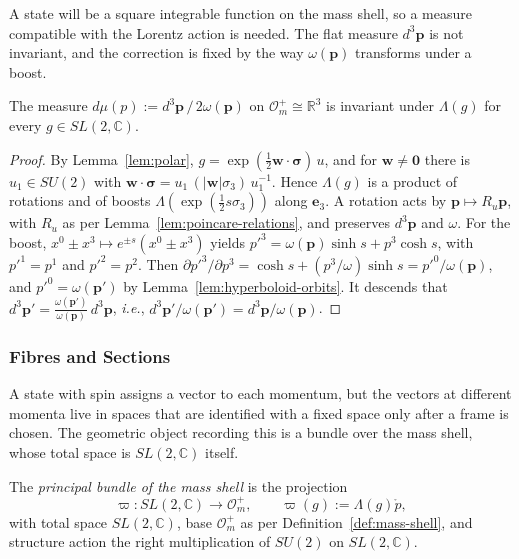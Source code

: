 A state will be a square integrable function on the mass shell, so a measure compatible with the Lorentz action is needed. The flat measure $d^3\mathbf{p}$ is not invariant, and the correction is fixed by the way $\omega(\mathbf{p})$ transforms under a boost.

\begin{lemma}\label{lem:invariant-measure}
	The measure $d\mu(p):=d^3\mathbf{p}\,/\,2\omega(\mathbf{p})$ on $\mathcal{O}_m^+\cong\mathbb{R}^3$ is invariant under $\Lambda(g)$ for every $g\in SL(2,\mathbb{C})$.
\end{lemma}

\begin{proof}
	By Lemma~\ref{lem:polar}, $g=\exp(\tfrac12\mathbf{w}\cdot\boldsymbol{\sigma})\,u$, and for $\mathbf{w}\neq\mathbf{0}$ there is $u_1\in SU(2)$ with $\mathbf{w}\cdot\boldsymbol{\sigma}=u_1\,(|\mathbf{w}|\sigma_3)\,u_1^{-1}$. Hence $\Lambda(g)$ is a product of rotations and of boosts $\Lambda(\exp(\tfrac12 s\sigma_3))$ along $\mathbf{e}_3$. A rotation acts by $\mathbf{p}\mapsto R_u\mathbf{p}$, with $R_u$ as per Lemma~\ref{lem:poincare-relations}, and preserves $d^3\mathbf{p}$ and $\omega$. For the boost, $x^0\pm x^3\mapsto e^{\pm s}(x^0\pm x^3)$ yields $p'^3=\omega(\mathbf{p})\sinh s+p^3\cosh s$, with $p'^1=p^1$ and $p'^2=p^2$. Then $\partial p'^3/\partial p^3=\cosh s+(p^3/\omega)\sinh s=p'^0/\omega(\mathbf{p})$, and $p'^0=\omega(\mathbf{p}')$ by Lemma~\ref{lem:hyperboloid-orbits}. It descends that $d^3\mathbf{p}'=\tfrac{\omega(\mathbf{p}')}{\omega(\mathbf{p})}\,d^3\mathbf{p}$, \textit{i.e.}, $d^3\mathbf{p}'/\omega(\mathbf{p}')=d^3\mathbf{p}/\omega(\mathbf{p})$.
\end{proof}

\subsubsection*{Fibres and Sections}

A state with spin assigns a vector to each momentum, but the vectors at different momenta live in spaces that are identified with a fixed space only after a frame is chosen. The geometric object recording this is a bundle over the mass shell, whose total space is $SL(2,\mathbb{C})$ itself.

\begin{definition}\label{def:principal-bundle}
	The \emph{principal bundle of the mass shell} is the projection
	\begin{equation*}
		\varpi:SL(2,\mathbb{C})\to\mathcal{O}_m^+,\qquad\varpi(g):=\Lambda(g)\mathring{p},
	\end{equation*}
	with total space $SL(2,\mathbb{C})$, base $\mathcal{O}_m^+$ as per Definition~\ref{def:mass-shell}, and structure action the right multiplication of $SU(2)$ on $SL(2,\mathbb{C})$.
\end{definition}

